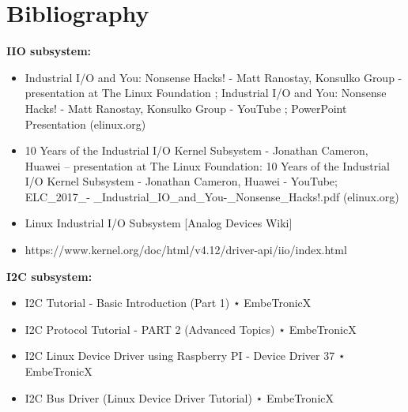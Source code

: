 \documentclass[l2pt, letterpaper]{article}
\begin{document}
\section{Bibliography}


\textbf{IIO subsystem:} \\
\begin{itemize}
    \item Industrial I/O and You: Nonsense Hacks! - Matt Ranostay, Konsulko Group
- presentation at The Linux Foundation ; Industrial I/O and You: Nonsense
Hacks! - Matt Ranostay, Konsulko Group - YouTube ; PowerPoint
Presentation (elinux.org)
    \item 10 Years of the Industrial I/O Kernel Subsystem - Jonathan Cameron,
Huawei – presentation at The Linux Foundation: 10 Years of the Industrial
I/O Kernel Subsystem - Jonathan Cameron, Huawei - YouTube; ELC\_2017\_-
\_Industrial\_IO\_and\_You-\_Nonsense\_Hacks!.pdf (elinux.org)
    \item Linux Industrial I/O Subsystem [Analog Devices Wiki]
    \item https://www.kernel.org/doc/html/v4.12/driver-api/iio/index.html \\
\end{itemize}
\newline
\newline
\newline
\textbf{I2C subsystem:} \\
\begin{itemize}
    \item I2C Tutorial - Basic Introduction (Part 1) ⋆ EmbeTronicX
    \item I2C Protocol Tutorial - PART 2 (Advanced Topics) ⋆ EmbeTronicX
    \item I2C Linux Device Driver using Raspberry PI - Device Driver 37 ⋆
EmbeTronicX
    \item I2C Bus Driver (Linux Device Driver Tutorial) ⋆ EmbeTronicX
\end{itemize}
\end{document}
